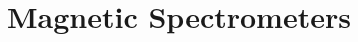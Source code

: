 \part{Magnetic Spectrometers}
\graphicspath{{hrs/figs/}}
\renewcommand{\dirfig}[0]{hrs/figs}
\renewcommand{\dircur}[0]{hrs}


\newpage

\newpage

\newpage

\newpage


